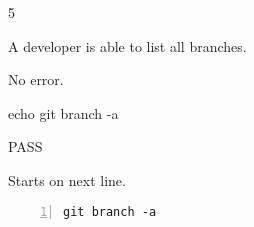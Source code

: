 \begin{description}[align=right,leftmargin=3.2cm,labelindent=3.0cm]
\item[Step:] 5
\item[Confirm:] A developer is able to list all branches.
\item[Expectation:] No error.
\item[Command:] echo git  branch -a
\item[Test Result:] PASS
\item[Evidence:] Starts on next line.
\end{description}
\begin{lstlisting}[numbers=left]
git branch -a

\end{lstlisting}

